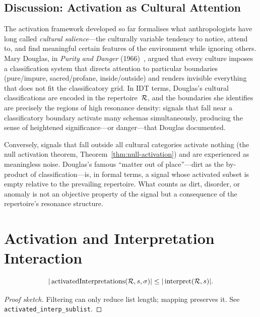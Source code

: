 \subsection*{Discussion: Activation as Cultural Attention}

The activation framework developed so far formalises what
anthropologists have long called \emph{cultural salience}---the
culturally variable tendency to notice, attend to, and find meaningful
certain features of the environment while ignoring others.  Mary
Douglas, in \emph{Purity and Danger} (1966)~\cite{douglas1966},
argued that every culture imposes a classification system that directs
attention to particular boundaries (pure/impure, sacred/profane,
inside/outside) and renders invisible everything that does not fit the
classificatory grid.  In IDT terms, Douglas's cultural classifications
are encoded in the repertoire~$\mathcal{R}$, and the boundaries she identifies
are precisely the regions of high resonance density: signals that fall
near a classificatory boundary activate many schemas simultaneously,
producing the sense of heightened significance---or danger---that
Douglas documented.

Conversely, signals that fall outside all cultural categories activate
nothing (the null activation theorem, Theorem~\ref{thm:null-activation})
and are experienced as meaningless noise.  Douglas's famous ``matter
out of place''---dirt as the by-product of classification---is, in
formal terms, a signal whose activated subset is empty relative to the
prevailing repertoire.  What counts as dirt, disorder, or anomaly is
not an objective property of the signal but a consequence of the
repertoire's resonance structure.

\section{Activation and Interpretation Interaction}
\label{sec:ch4:interaction}

\begin{theorem}
\label{thm:activated-sublist}
\[
  |\operatorname{activatedInterpretations}(\mathcal{R}, s, \sigma)|
  \leq |\operatorname{interpret}(\mathcal{R}, s)|.
\]
\end{theorem}

\begin{proof}[Proof sketch]
Filtering can only reduce list length; mapping preserves it.
See \texttt{activated\_interp\_sublist}.
\end{proof}

